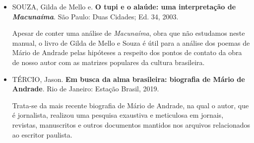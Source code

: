 \documentclass[11pt]{extarticle}
\begin{document}
\begin{itemize}
\item SOUZA, Gilda de Mello e. \textbf{O tupi e o alaúde: uma interpretação de
\emph{Macunaíma}}. São Paulo: Duas Cidades; Ed. 34, 2003.

Apesar de conter uma análise de \emph{Macunaíma}, obra que não estudamos
neste manual, o livro de Gilda de Mello e Souza é útil para a análise
dos poemas de Mário de Andrade pelas hipóteses a respeito dos pontos de
contato da obra de nosso autor com as matrizes populares da cultura
brasileira.

\item TÉRCIO, Jason. \textbf{Em busca da alma brasileira: biografia de Mário
de Andrade}. Rio de Janeiro: Estação Brasil, 2019.

Trata-se da mais recente biografia de Mário de Andrade, na qual o autor,
que é jornalista, realizou uma pesquisa exaustiva e meticulosa em
jornais, revistas, manuscritos e outros documentos mantidos nos arquivos
relacionados ao escritor paulista.

\end{itemize}
\end{document}
